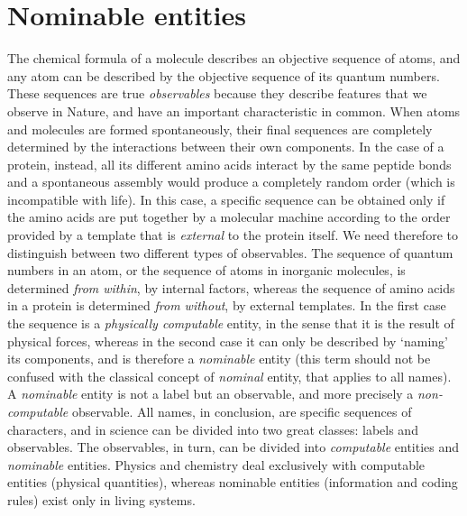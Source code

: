\documentclass[12pt]{article}
\begin{document}
\section{Nominable entities}
The chemical formula of a molecule describes an objective sequence of atoms, and any atom can be described by the objective sequence of its quantum numbers. These sequences are true \textit{observables} because they describe features that we observe in Nature, and have an important characteristic in common. When atoms and molecules are formed spontaneously, their final sequences are completely determined by the interactions between their own components. In the case of a protein, instead, all its different amino acids interact by the same peptide bonds and a spontaneous assembly would produce a completely random order (which is incompatible with life). In this case, a specific sequence can be obtained only if the amino acids are put together by a molecular machine according to the order provided by a template that is \textit{external} to the protein itself. We need therefore to distinguish between two different types of observables. The sequence of quantum numbers in an atom, or the sequence of atoms in inorganic molecules, is determined \textit{from within}, by internal factors, whereas the sequence of amino acids in a protein is determined \textit{from without}, by external templates. In the first case the sequence is a \textit{physically computable} entity, in the sense that it is the result of physical forces, whereas in the second case it can only be described by `naming' its components, and is therefore a \textit{nominable} entity (this term should not be confused with the classical concept of \textit{nominal} entity, that applies to all names). A \textit{nominable} entity is not a label but an observable, and more precisely a \textit{non-computable} observable. All names, in conclusion, are specific sequences of characters, and in science can be divided into two great classes: labels and observables. The observables, in turn, can be divided into \textit{computable} entities and \textit{nominable} entities. Physics and chemistry deal exclusively with computable entities (physical quantities), whereas nominable entities (information and coding rules) exist only in living systems. 
 
\end{document}
